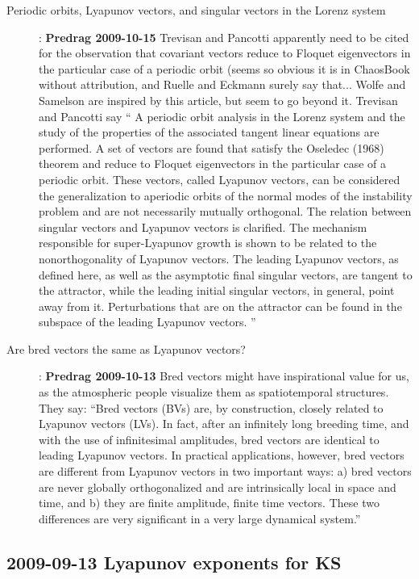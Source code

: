 \begin{description}
\item[Periodic orbits, Lyapunov vectors, and singular vectors
      in the Lorenz system]:
{\bf Predrag 2009-10-15} Trevisan and Pancotti apparently
need to be cited for the observation that covariant vectors
reduce to Floquet eigenvectors in the particular case of a
periodic orbit (seems so obvious it is in ChaosBook without
attribution, and Ruelle and Eckmann surely say
that... Wolfe and Samelson are inspired by this
article, but seem to go beyond it. Trevisan and Pancotti say
``
A periodic orbit analysis in the Lorenz system
and the study of the properties of the associated tangent
linear equations are performed. A set of vectors are found
that satisfy the Oseledec (1968) theorem and reduce to
Floquet eigenvectors in the particular case of a periodic
orbit. These vectors, called Lyapunov vectors, can be
considered the generalization to aperiodic orbits of the
normal modes of the instability problem and are not
necessarily mutually orthogonal. The relation between
singular vectors and Lyapunov vectors is clarified. The
mechanism responsible for super-Lyapunov growth is shown to
be related to the nonorthogonality of Lyapunov vectors. The
leading Lyapunov vectors, as defined here, as well as the
asymptotic final singular vectors, are tangent to the
attractor, while the leading initial singular vectors, in
general, point away from it. Perturbations that are on the
attractor can be found in the subspace of the leading
Lyapunov vectors.
    ''


\item[Are bred vectors the same as
    {L}yapunov vectors?]:
{\bf Predrag 2009-10-13} Bred vectors might have inspirational
value for us, as the atmospheric people visualize them as
spatiotemporal structures. They say:
    ``Bred vectors (BVs) are, by construction, closely
related to Lyapunov vectors (LVs). In fact, after an
infinitely long breeding time, and with the use of
infinitesimal amplitudes, bred vectors are identical to
leading Lyapunov vectors. In practical applications,
however, bred vectors are different from Lyapunov
vectors in two important ways: a) bred vectors are
never globally orthogonalized and are intrinsically
local in space and time, and b) they are finite
amplitude, finite time vectors. These two differences
are very significant in a very large dynamical system.''

\end{description}

\subsection{2009-09-13 Lyapunov exponents for KS}

